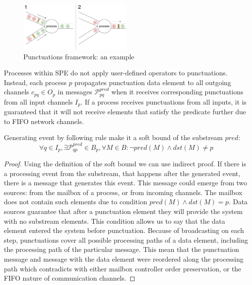 \begin{figure}[htbp]
  \centering
  \includegraphics[width=0.50\textwidth]{pics/punctuations-scheme.pdf}
  \caption{Punctuations framework: an example}
  \label{punctuations_scheme}
\end{figure}

Processes within SPE do not apply user-defined operators to punctuations. Instead, each process $p$ propagates punctuation data element to all outgoing channels $c_{pq} \in O_p$ in messages $\mathcal{P}_{pq}^{pred}$ when it receives corresponding punctuations from all input channels $I_p$. If a process receives punctuations from all inputs, it is guaranteed that it will not receive elements that satisfy the predicate further due to FIFO network channels. 
\begin{lemma}
Generating event by following rule make it a soft bound of the substream $pred$:
\begin{equation}
\forall q \in I_p, \exists \mathcal{P}^{pred}_{qp} \in B_p, \forall M\in B : \neg pred(M) \wedge dst(M) \ne p
\end{equation}
\end{lemma}
\begin{proof}
Using the definition of the soft bound we can use indirect proof. If there is a processing event from the substream, that happens after the generated event, there is a message that generates this event. This message could emerge from two sources: from the mailbox of a process, or from incoming channels. The mailbox does not contain such elements due to condition $pred(M) \wedge dst(M) = p$. Data sources guarantee that after a punctuation element they will provide the system with no substream elements. This condition allows us to say that the data element entered the system before punctuation. Because of broadcasting on each step, punctuations cover all possible processing paths of a data element, including the processing path of the particular message. This mean that the punctuation message and message with the data element were reordered along the processing path which contradicts with either mailbox controller order preservation, or the FIFO nature of communication channels.
\end{proof}

